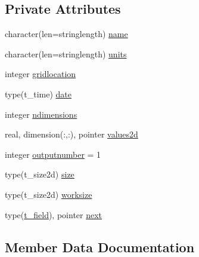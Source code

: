 \subsection*{Private Attributes}
\begin{DoxyCompactItemize}
\item 
character(len=stringlength) \mbox{\hyperlink{structmodulemog2dformat_1_1t__field_a3da0e137d4474f16c0c37564e9465198}{name}}
\item 
character(len=stringlength) \mbox{\hyperlink{structmodulemog2dformat_1_1t__field_a4927b9f654f4ab3baf634208d6d4aed3}{units}}
\item 
integer \mbox{\hyperlink{structmodulemog2dformat_1_1t__field_af7955fc64f77763b216014cbf1ddadbd}{gridlocation}}
\item 
type(t\+\_\+time) \mbox{\hyperlink{structmodulemog2dformat_1_1t__field_a5853db80f0c8b863c50c3ceec52aede2}{date}}
\item 
integer \mbox{\hyperlink{structmodulemog2dformat_1_1t__field_acd2ab56f96f1e6d23f89188d3ed9b056}{ndimensions}}
\item 
real, dimension(\+:,\+:), pointer \mbox{\hyperlink{structmodulemog2dformat_1_1t__field_a82c8d57747512f912294262ebcc830a2}{values2d}}
\item 
integer \mbox{\hyperlink{structmodulemog2dformat_1_1t__field_a3570ac5cf1949fe2b586f6ef6d0ba3d2}{outputnumber}} = 1
\item 
type(t\+\_\+size2d) \mbox{\hyperlink{structmodulemog2dformat_1_1t__field_a7a7a7f96967fa408318705c749ac0185}{size}}
\item 
type(t\+\_\+size2d) \mbox{\hyperlink{structmodulemog2dformat_1_1t__field_a8dbe2e88397c780bc8d895f9f3bd1f35}{worksize}}
\item 
type(\mbox{\hyperlink{structmodulemog2dformat_1_1t__field}{t\+\_\+field}}), pointer \mbox{\hyperlink{structmodulemog2dformat_1_1t__field_a562d1df7ae112557f41acbb016130635}{next}}
\end{DoxyCompactItemize}


\subsection{Member Data Documentation}
\mbox{\label{structmodulemog2dformat_1_1t__field_a5853db80f0c8b863c50c3ceec52aede2}} 
